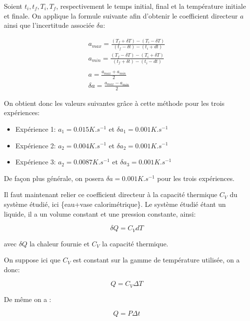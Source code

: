 \documentclass[12pt]{article}
\begin{document}
Soient $t_i, t_f, T_i, T_f$, respectivement le temps initial, final et la température initiale et finale. On applique la formule suivante afin d'obtenir le coefficient directeur $a$ ainsi que l'incertitude associée $\delta a$:

\begin{gather*}
	a_{max} = \frac{(T_f + \delta T) - (T_i - \delta T)}{(t_f - \delta t) - (t_i + dt)} \\
	a_{min} = \frac{(T_f - \delta T) - (T_i + \delta T)}{(t_f + \delta t) - (t_i - dt)} \\
	\\
	a = \frac{a_{max} + a_{min}}{2} \\
	\delta a = \frac{a_{max} - a_{min}}{2}
\end{gather*}

On obtient donc les valeurs suivantes grâce à cette méthode pour les trois expériences:
\begin{itemize}
	\item Expérience 1: $a_1 = 0.015 K.s^{-1}$ et $\delta a_1 = 0.001 K.s^{-1}$
	\item Expérience 2: $a_2 = 0.004 K.s^{-1}$ et $\delta a_2 = 0.001 K.s^{-1}$
	\item Expérience 3: $a_2 = 0.0087 K.s^{-1}$ et $\delta a_3 = 0.001 K.s^{-1}$
\end{itemize}

De façon plus générale, on posera $\delta a = 0.001 K.s^{-1}$ pour les trois expériences.

\newpage
Il faut maintenant relier ce coefficient directeur à la capacité thermique $C_V$ du système étudié, ici \{eau+vase calorimétrique\}.
Le système étudié étant un liquide, il a un volume constant et une pression constante, ainsi:

\begin{equation}
\delta Q=C_VdT
\end{equation}

avec $\delta Q$ la chaleur fournie et $C_V$ la capacité thermique. 

On suppose ici que $C_V$ est constant sur la gamme de température utilisée, on a donc:

\begin{equation}
Q=C_V\Delta T
\end{equation}

De même on a :

\begin{equation}
Q=P\Delta t
\end{equation}
\end{document}
